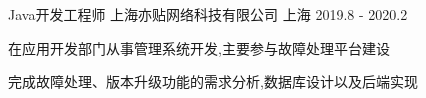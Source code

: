

\begin{cventries}

  \cventry
    {Java开发工程师} %
    {上海亦贴网络科技有限公司} %
    {上海} %
    {2019.8 - 2020.2} %
    {
      \begin{cvitems} %
        \item {在应用开发部门从事管理系统开发,主要参与故障处理平台建设}
        \item {完成故障处理、版本升级功能的需求分析,数据库设计以及后端实现}
      \end{cvitems}
    }

\end{cventries}
